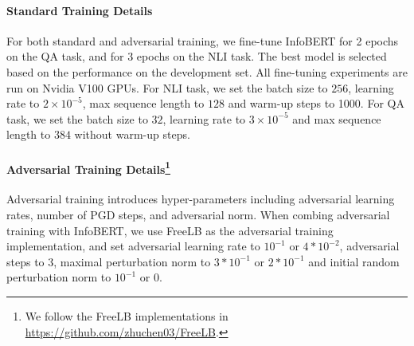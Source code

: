 \documentclass{article} \usepackage{iclr2021_conference,times}
\theoremstyle{definition}
\theoremstyle{remark}
\newcommand{\method}{InfoBERT\xspace}
\begin{document}
\paragraph{Standard Training Details} For both standard and adversarial training, we fine-tune \method for 2 epochs on the QA task, and for 3 epochs on the NLI task. The best model is selected based on the performance on the development set. All fine-tuning experiments are run on Nvidia V100 GPUs. For NLI task, we set the batch size to $256$, learning rate to $2 \times 10^{-5}$, max sequence length to $128$ and warm-up steps to 1000. For QA task,  we set the batch size to $32$, learning rate to $3\times 10^{-5}$ and max sequence length to $384$ without warm-up steps. 

\paragraph[Adversarial Training Details]{Adversarial Training Details\footnote{We follow the FreeLB implementations in \url{https://github.com/zhuchen03/FreeLB}.}} Adversarial training introduces hyper-parameters including adversarial learning rates, number of PGD steps, and adversarial norm. When combing adversarial training with \method, we use FreeLB as the adversarial training implementation, and set adversarial learning rate to $10^{-1}$ or $4*10^{-2}$, adversarial steps to $3$, maximal perturbation norm to $3* 10^{-1}$ or $2*10^{-1}$ and initial random perturbation norm to $10^{-1}$ or $0$.
\end{document}
